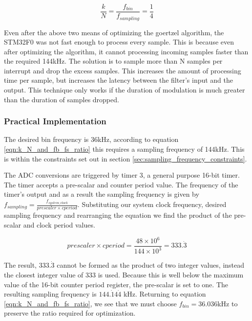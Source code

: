 \begin{equation}
\label{eqn:k_N_and_fb_fs_ratio}
\frac{k}{N} = \frac{f_{bin}}{f_{sampling}} = \frac{1}{4}
\end{equation}

Even after the above two means of optimizing the goertzel algorithm, the STM32F0 was not fast enough to process every sample. This is because even after optimizing the algorithm, it cannot processing incoming samples faster than the required 144kHz. The solution is to sample more than N samples per interrupt and drop the excess samples. This increases the amount of processing time per sample, but increases the latency between the filter's input and the output. This technique only works if the duration of modulation is much greater than the duration of samples dropped.

\subsubsection{Practical Implementation}

The desired bin frequency is 36kHz, according to equation \ref{eqn:k_N_and_fb_fs_ratio} this requires a sampling frequency of 144kHz. This is within the constraints set out in section \ref{sec:sampling_frequency_constraints}.

The ADC conversions are triggered by timer 3, a general purpose 16-bit timer. The timer accepts a pre-scalar and counter period value. The frequency of the timer's output and as a result the sampling frequency is given by \(f_{sampling} = \frac{f_{system\_clock}}{prescaler \times cperiod}\). Substituting our system clock frequency, desired sampling frequency and rearranging the equation we find the product of the pre-scalar and clock period values.

\[prescaler \times cperiod = \frac{48 \times 10^6}{144 \times 10^3} = 333.\dot{3}\]

The result, $333.\dot{3}$ cannot be formed as the product of two integer values, instead the closest integer value of 333 is used. Because this is well below the maximum value of the 16-bit counter period register, the pre-scalar is set to one. The resulting sampling frequency is $144.\dot{1}4\dot{4}$ kHz. Returning to equation \ref{eqn:k_N_and_fb_fs_ratio}, we see that we must choose $f_{bin} = 36.036$kHz to preserve the ratio required for optimization.











